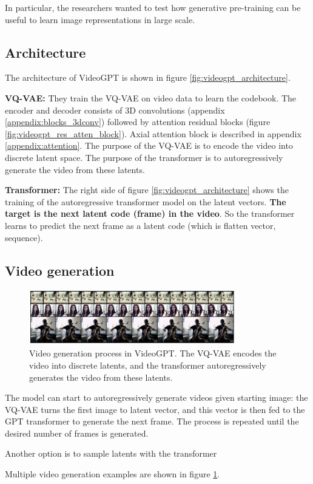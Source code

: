 In particular, the researchers wanted to test how generative pre-training can be useful to learn image representations in large scale.






\subsection{Architecture}

The architecture of VideoGPT is shown in figure \ref{fig:videogpt_architecture}.

\textbf{VQ-VAE:} They train the VQ-VAE on video data to learn the codebook. The encoder and decoder consists of 3D convolutions (appendix \ref{appendix:blocks_3dconv}) followed by attention residual blocks (figure \ref{fig:videogpt_res_atten_block}). Axial attention \cite{axial_attention} block is described in appendix \ref{appendix:attention}. The purpose of the VQ-VAE is to encode the video into discrete latent space. The purpose of the transformer is to autoregressively generate the video from these latents.

\textbf{Transformer:} The right side of figure \ref{fig:videogpt_architecture} shows the training of the autoregressive transformer model on the latent vectors. \textbf{The target is the next latent code (frame) in the video}. So the transformer learns to predict the next frame as a latent code (which is flatten vector, sequence).




\subsection{Video generation}

\begin{figure}
    \centering
    \includegraphics[width=0.8\textwidth]{images/video_gpt/video_generation.png}
    \caption{Video generation process in VideoGPT. The VQ-VAE encodes the video into discrete latents, and the transformer autoregressively generates the video from these latents.}
    \label{fig:videogpt_video_generation}
\end{figure}

The model can start to autoregressively generate videos given starting image: the VQ-VAE turns the first image to latent vector, and this vector is then fed to the GPT transformer to generate the next frame. The process is repeated until the desired number of frames is generated.

Another option is to sample latents with the transformer

Multiple video generation examples are shown in figure \ref{fig:videogpt_video_generation}.